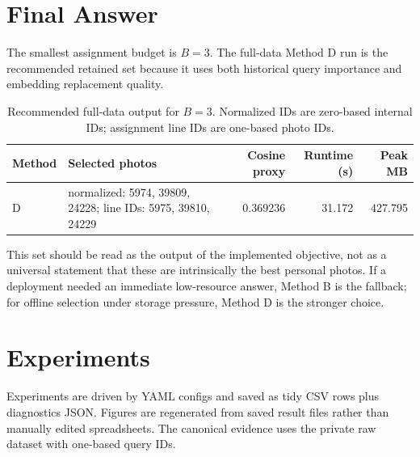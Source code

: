 \documentclass[sigconf,nonacm]{acmart}
\newcommand{\budget}{B}
\begin{document}
\section{Final Answer}

The smallest assignment budget is $\budget=3$. The full-data Method D run is the recommended retained set because it uses both historical query importance and embedding replacement quality.

\begin{table}[!htbp]
  \centering
  \caption{Recommended full-data output for $\budget=3$. Normalized IDs are zero-based internal IDs; assignment line IDs are one-based photo IDs.}
  \label{tab:final-answer}
  \small
  \begin{tabularx}{\textwidth}{@{}lYrrr@{}}
    \toprule
    Method & Selected photos & Cosine proxy & Runtime (s) & Peak MB \\
    \midrule
    D & normalized: 5974, 39809, 24228; line IDs: 5975, 39810, 24229 & 0.369236 & 31.172 & 427.795 \\
    \bottomrule
  \end{tabularx}
\end{table}

This set should be read as the output of the implemented objective, not as a universal statement that these are intrinsically the best personal photos. If a deployment needed an immediate low-resource answer, Method B is the fallback; for offline selection under storage pressure, Method D is the stronger choice.

\section{Experiments}

Experiments are driven by YAML configs and saved as tidy CSV rows plus diagnostics JSON. Figures are regenerated from saved result files rather than manually edited spreadsheets. The canonical evidence uses the private raw dataset with one-based query IDs.
\end{document}
